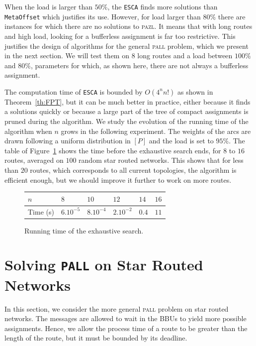 \documentclass[a4paper,10pt]{article}
\newcommand\metaoffset{\texttt{MetaOffset}\xspace}
\newcommand\ESCA{\texttt{ESCA}\xspace}
\newcommand\pazl{\textsc{pazl}\xspace}
\newcommand\pall{\textsc{pall}\xspace}
\begin{document}
       When the load is larger than $50\%$, the \ESCA finds more solutions than \metaoffset which justifies its use. However, for load larger than $80\%$ there are instances for which there are no solutions to \pazl. It means that with long routes and high load, looking for a bufferless assignment is far too restrictive. This justifies the design of algorithms for the general \pall problem, which we present in the next section. We will test them on $8$ long routes and a load between $100\%$ and $80\%$, parameters for which, as shown here, there are not always a bufferless assignment.
      
       The computation time of \ESCA is bounded by $O(4^nn!)$ as shown in Theorem~\ref{th:FPT}, but it can be much better in practice, either because it finds a solutions quickly or because a large part of the tree of compact assignments is pruned during the algorithm. We study the evolution of the running time  of the algorithm when $n$ grows in the following experiment. The weights of the arcs are drawn following a uniform distribution in $[P]$ and the load is set to $95\%$.  The table of Figure~\ref{fig:table} shows the time before the exhaustive search ends, for $8$ to $16$ routes, averaged on $100$ random star routed networks. This shows that for less than $20$ routes, which corresponds to all current topologies, the algorithm is efficient enough, but we should improve it further to work on more routes.
       
             \begin{figure}[h]
         \begin{center}
         \begin{tabularx}{0.9\textwidth}{|l|X|X|X|X|X|}
    \hline
   $n$ & $8$ & $10$& $12$&$14$& $16$\\
    \hline
   Time (s) & $6.10^{-5}$&$8.10^{-4}$&$2.10^{-2}$& $0.4$& $11$\\
    \hline
      \end{tabularx}
      \end{center}
      \caption{Running time of the exhaustive search.}
      \label{fig:table}
      \end{figure}
      
         \section{Solving \texttt{PALL} on Star Routed Networks}\label{sec:PALL}
    
    In this section, we consider the more general \pall problem on star routed networks. The messages are allowed to wait in the BBUs to yield more possible assignments. Hence, we allow the process time of a route to be greater than the length of the route, but it must be bounded by its deadline.
\end{document}
